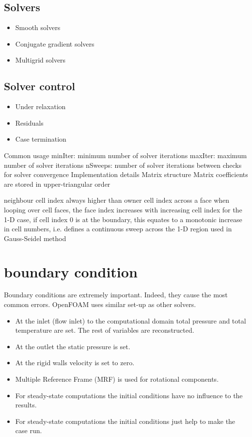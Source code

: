 \documentclass{article}
\begin{document}
\subsection{Solvers}

\begin{itemize}
\item Smooth solvers
\item Conjugate gradient solvers
\item Multigrid solvers
\end{itemize}

\subsection{Solver control}
\begin{itemize}
\item Under relaxation
\item Residuals
\item Case termination
\end{itemize}

Common usage
minIter: minimum number of solver iterations
maxIter: maximum number of solver iterations
nSweeps: number of solver iterations between checks for solver convergence
Implementation details
Matrix structure
Matrix coefficients are stored in upper-triangular order

neighbour cell index always higher than owner cell index across a face
when looping over cell faces, the face index increases with increasing cell index
for the 1-D case, if cell index 0 is at the boundary, this equates to a monotonic increase in cell numbers, i.e. defines a continuous sweep across the 1-D region
used in Gauss-Seidel method


\section{boundary condition}

Boundary conditions are extremely important. Indeed, they cause the most common errors.
OpenFOAM uses similar set-up as other solvers.
\begin{itemize}
    \item At the inlet (flow inlet) to the computational domain total pressure and total temperature are set. The rest of variables are reconstructed.
    \item At the outlet the static pressure is set.
    \item At the rigid walls velocity is set to zero.
    \item Multiple Reference Frame (MRF) is used for rotational components.
    \item For steady-state computations the initial conditions have no influence to the results.
    \item For steady-state computations the initial conditions just help to make the case run.
\end{itemize}
\end{document}
